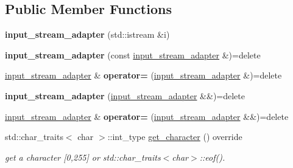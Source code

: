 \subsection*{Public Member Functions}
\begin{DoxyCompactItemize}
\item 
\mbox{\label{classnlohmann_1_1detail_1_1input__stream__adapter_af487152e4606d013eb4ec6a90eaf82ea}} 
{\bfseries input\+\_\+stream\+\_\+adapter} (std\+::istream \&i)
\item 
\mbox{\label{classnlohmann_1_1detail_1_1input__stream__adapter_a5190fe4d0c5ff2e3b348b28ee3bb2218}} 
{\bfseries input\+\_\+stream\+\_\+adapter} (const \hyperlink{classnlohmann_1_1detail_1_1input__stream__adapter}{input\+\_\+stream\+\_\+adapter} \&)=delete
\item 
\mbox{\label{classnlohmann_1_1detail_1_1input__stream__adapter_aeac5048221929b8f7558d1698dd0fb3a}} 
\hyperlink{classnlohmann_1_1detail_1_1input__stream__adapter}{input\+\_\+stream\+\_\+adapter} \& {\bfseries operator=} (\hyperlink{classnlohmann_1_1detail_1_1input__stream__adapter}{input\+\_\+stream\+\_\+adapter} \&)=delete
\item 
\mbox{\label{classnlohmann_1_1detail_1_1input__stream__adapter_a0ae74b874f7db43640905cb7f2442b1d}} 
{\bfseries input\+\_\+stream\+\_\+adapter} (\hyperlink{classnlohmann_1_1detail_1_1input__stream__adapter}{input\+\_\+stream\+\_\+adapter} \&\&)=delete
\item 
\mbox{\label{classnlohmann_1_1detail_1_1input__stream__adapter_a3577dff99cc91968557b52959b0363e4}} 
\hyperlink{classnlohmann_1_1detail_1_1input__stream__adapter}{input\+\_\+stream\+\_\+adapter} \& {\bfseries operator=} (\hyperlink{classnlohmann_1_1detail_1_1input__stream__adapter}{input\+\_\+stream\+\_\+adapter} \&\&)=delete
\item 
\mbox{\label{classnlohmann_1_1detail_1_1input__stream__adapter_ae0760af923583de6354725e901d1869d}} 
std\+::char\+\_\+traits$<$ char $>$\+::int\+\_\+type \hyperlink{classnlohmann_1_1detail_1_1input__stream__adapter_ae0760af923583de6354725e901d1869d}{get\+\_\+character} () override
\begin{DoxyCompactList}\small\item\em get a character \mbox{[}0,255\mbox{]} or std\+::char\+\_\+traits$<$char$>$\+::eof(). \end{DoxyCompactList}\end{DoxyCompactItemize}


